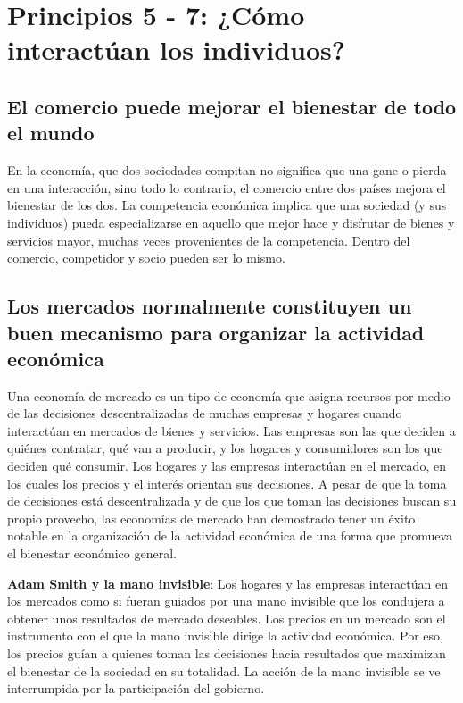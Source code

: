 \documentclass{report}
\begin{document}
\section{Principios 5 - 7: ¿Cómo interactúan los individuos?}
\subsection{El comercio puede mejorar el bienestar de todo el mundo}
En la economía, que dos sociedades compitan no significa que una gane o pierda en una interacción, sino todo lo contrario, el comercio entre dos países mejora el bienestar de los dos.
La competencia económica implica que una sociedad (y sus individuos) pueda especializarse en aquello que mejor hace y disfrutar de bienes y servicios mayor, muchas veces provenientes de la competencia. Dentro del comercio, competidor y socio pueden ser lo mismo.

\subsection{Los mercados normalmente constituyen un buen mecanismo para organizar la actividad económica}
Una economía de mercado es un tipo de economía que asigna recursos por medio de las decisiones descentralizadas de muchas empresas y hogares cuando interactúan en mercados de bienes y servicios.
Las empresas son las que deciden a quiénes contratar, qué van a producir, y los hogares y consumidores son los que deciden qué consumir. Los hogares y las empresas interactúan en el mercado, en los cuales los precios y el interés orientan sus decisiones. A pesar de que la toma de decisiones está descentralizada y de que los que toman las decisiones buscan su propio provecho, las economías de mercado han demostrado tener un éxito notable en la organización de la actividad económica de una forma que promueva el bienestar económico general.

\textbf{Adam Smith y la mano invisible}: Los hogares y las empresas interactúan en los mercados como si fueran guiados por una mano invisible que los condujera a obtener unos resultados de mercado deseables. Los precios en un mercado son el instrumento con el que la mano invisible dirige la actividad económica. Por eso, los precios guían a quienes toman las decisiones hacia resultados que maximizan el bienestar de la sociedad en su totalidad. La acción de la mano invisible se ve interrumpida por la participación del gobierno.
\end{document}
